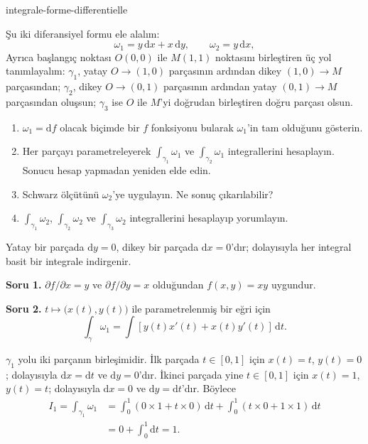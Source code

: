 
\begin{exo}{integrale-forme-differentielle}

Şu iki diferansiyel formu ele alalım:
\[
\omega_1 = y\,\mathrm{d}x + x\,\mathrm{d}y,
\qquad
\omega_2 = y\,\mathrm{d}x,
\]
Ayrıca başlangıç noktası $O(0,0)$ ile $M(1,1)$ noktasını birleştiren üç yol
tanımlayalım: $\gamma_1$, yatay $O\to(1,0)$ parçasının ardından dikey
$(1,0)\to M$ parçasından; $\gamma_2$, dikey $O\to(0,1)$ parçasının ardından
yatay $(0,1)\to M$ parçasından oluşsun; $\gamma_3$ ise $O$ ile $M$'yi doğrudan
birleştiren doğru parçası olsun.

\begin{enumerate}
\item $\omega_1=\mathrm{d}f$ olacak biçimde bir $f$ fonksiyonu bularak $\omega_1$'in tam olduğunu gösterin.
\item Her parçayı parametreleyerek $\int_{\gamma_1}\omega_1$ ve $\int_{\gamma_2}\omega_1$ integrallerini hesaplayın. Sonucu hesap yapmadan yeniden elde edin.
\item Schwarz ölçütünü $\omega_2$'ye uygulayın. Ne sonuç çıkarılabilir?
\item $\int_{\gamma_1}\omega_2$, $\int_{\gamma_2}\omega_2$ ve $\int_{\gamma_3}\omega_2$ integrallerini hesaplayıp yorumlayın.
\end{enumerate}

\begin{indication}
Yatay bir parçada $\mathrm{d}y=0$, dikey bir parçada $\mathrm{d}x=0$'dır;
dolayısıyla her integral basit bir integrale indirgenir.
\end{indication}

\begin{solution}
\textbf{Soru 1.} $\partial f/\partial x=y$ ve $\partial f/\partial y=x$ olduğundan $f(x,y)=xy$ uygundur.

\textbf{Soru 2.} $t\mapsto\bigl(x(t),y(t)\bigr)$ ile parametrelenmiş bir eğri için
\[
\int_\gamma\omega_1
= \int \left[y(t)x'(t)+x(t)y'(t)\right]\,\mathrm{d}t.
\]

$\gamma_1$ yolu iki parçanın birleşimidir. İlk parçada $t\in[0,1]$ için
$x(t)=t$, $y(t)=0$; dolayısıyla $\mathrm{d}x=\mathrm{d}t$ ve
$\mathrm{d}y=0$'dır. İkinci parçada yine $t\in[0,1]$ için $x(t)=1$,
$y(t)=t$; dolayısıyla $\mathrm{d}x=0$ ve $\mathrm{d}y=\mathrm{d}t$'dır. Böylece
\[
\begin{aligned}
I_1
= \int_{\gamma_1}\omega_1
&= \int_0^1\left(0\times 1+t\times 0\right)\,\mathrm{d}t
 + \int_0^1\left(t\times 0+1\times 1\right)\,\mathrm{d}t \\
&= 0+\int_0^1\mathrm{d}t = 1.
\end{aligned}
\]


\end{solution}
\end{exo}
